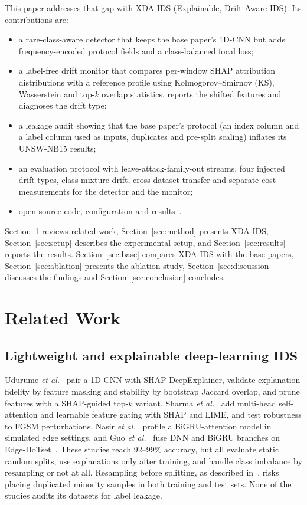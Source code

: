 \documentclass[pdflatex,sn-mathphys-num]{sn-jnl}%
\begin{document}
This paper addresses that gap with XDA-IDS (Explainable, Drift-Aware IDS). Its contributions are:
\begin{itemize}
\item a rare-class-aware detector that keeps the base paper's 1D-CNN but adds frequency-encoded protocol fields and a class-balanced focal loss;
\item a label-free drift monitor that compares per-window SHAP attribution distributions with a reference profile using Kolmogorov--Smirnov (KS), Wasserstein and top-$k$ overlap statistics, reports the shifted features and diagnoses the drift type;
\item a leakage audit showing that the base paper's protocol (an index column and a label column used as inputs, duplicates and pre-split scaling) inflates its UNSW-NB15 results;
\item an evaluation protocol with leave-attack-family-out streams, four injected drift types, class-mixture drift, cross-dataset transfer and separate cost measurements for the detector and the monitor;
\item open-source code, configuration and results~\cite{repo}.
\end{itemize}

Section~\ref{sec:related} reviews related work, Section~\ref{sec:method} presents XDA-IDS, Section~\ref{sec:setup} describes the experimental setup, and Section~\ref{sec:results} reports the results. Section~\ref{sec:base} compares XDA-IDS with the base papers, Section~\ref{sec:ablation} presents the ablation study, Section~\ref{sec:discussion} discusses the findings and Section~\ref{sec:conclusion} concludes.

\section{Related Work}\label{sec:related}
\subsection{Lightweight and explainable deep-learning IDS}
Udurume \textit{et al.}~\cite{udurume2026} pair a 1D-CNN with SHAP DeepExplainer, validate explanation fidelity by feature masking and stability by bootstrap Jaccard overlap, and prune features with a SHAP-guided top-$k$ variant. Sharma \textit{et al.}~\cite{sharma2025} add multi-head self-attention and learnable feature gating with SHAP and LIME, and test robustness to FGSM perturbations. Nasir \textit{et al.}~\cite{nasir2026} profile a BiGRU-attention model in simulated edge settings, and Guo \textit{et al.}~\cite{guo2026} fuse DNN and BiGRU branches on Edge-IIoTset~\cite{ferrag2022}. These studies reach 92--99\% accuracy, but all evaluate static random splits, use explanations only after training, and handle class imbalance by resampling or not at all. Resampling before splitting, as described in~\cite{sharma2025}, risks placing duplicated minority samples in both training and test sets. None of the studies audits its datasets for label leakage.
\end{document}

